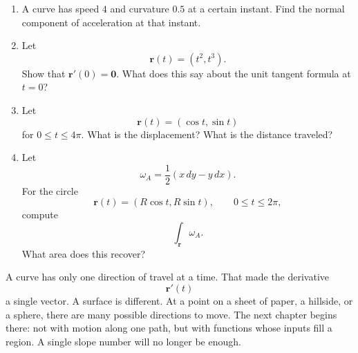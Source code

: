 \begin{enumerate}
\item A curve has speed \(4\) and curvature \(0.5\) at a certain instant.  Find the
normal component of acceleration at that instant.

\item Let
\[
    \mathbf r(t)=(t^2,t^3).
\]
Show that \(\mathbf r'(0)=\mathbf 0\).  What does this say about the unit tangent
formula at \(t=0\)?

\item Let
\[
    \mathbf r(t)=(\cos t,\sin t)
\]
for \(0\le t\le4\pi\).  What is the displacement?  What is the distance traveled?

\item Let
\[
    \omega_A=\frac12(x\,dy-y\,dx).
\]
For the circle
\[
    \mathbf r(t)=(R\cos t,R\sin t),
    \qquad 0\le t\le2\pi,
\]
compute
\[
    \int_{\mathbf r}\omega_A.
\]
What area does this recover?
\end{enumerate}

A curve has only one direction of travel at a time.  That made the derivative
\[
    \mathbf r'(t)
\]
a single vector.  A surface is different.  At a point on a sheet of paper, a hillside, or a
sphere, there are many possible directions to move.  The next chapter begins there:
not with motion along one path, but with functions whose inputs fill a region.  A
single slope number will no longer be enough.